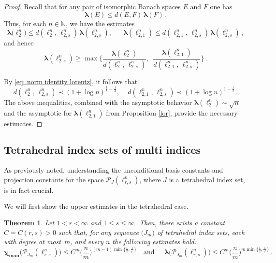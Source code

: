 \documentclass[12pt]{amsart}
\numberwithin{subsection}{section}
\newtheorem{theorem}{Theorem}[section]
\theoremstyle{definition}
\theoremstyle{remark}
\DeclareMathOperator{\mon}{mon}
\newcommand{\chimon}{\chi_{\mon}}
\begin{document}
\begin{proof}
Recall that for any pair of isomorphic Banach spaces $E$ and $F$ one has
\[
\boldsymbol{\lambda}(E) \leq d(E, F)\, \boldsymbol{\lambda}(F)\,.
\]
Thus, for each $n\in \mathbb{N}$, we have the estimates
\[
\boldsymbol{\lambda}({\ell_2^n)} \leq d(\ell_2^n,\, \ell_{2, s}^n)\,\boldsymbol{\lambda}(\ell_{2, s}^n), \quad \,\,\,\,
\boldsymbol{\lambda}{(\ell_{2, 1}^n)} \leq d(\ell_{2, 1}^n, \, \ell_{2, s}^n)\, \boldsymbol{\lambda}(\ell_{2, s}^n)\,,
\]
and hence
\[
\boldsymbol{\lambda}(\ell^n_{2,s}) \geq \max \Bigg\{ \frac{\boldsymbol{\lambda}(\ell_2^n)}{d(\ell_2^n,\, \ell_{2, s}^n)},
\,\,\, \frac{\boldsymbol{\lambda}(\ell_{2, 1}^n)}{d(\ell_{2, 1}^n, \, \ell_{2, s}^n)}\Bigg\}\,.
\]


\noindent
By \eqref{eq: norm identity lorentz}, it follows that
\[
d(\ell_2^n,\,\ell_{2, s}^n) \prec (1 + \log n)^{\frac{1}{s}-\frac{1}{2}}, \quad\,
d(\ell_{2, 1}^n,\,\ell_{2, s}^n )\prec (1 + \log n)^{1-\frac{1}{s}}\,.
\]
The above inequalities, combined with the asymptotic behavior $\boldsymbol{\lambda}(\ell_2^n) \sim \sqrt{n}$ and the asymptotic
for $\boldsymbol{\lambda}(\ell_{2,1}^n)$ from Proposition \ref{lor}, provide the necessary estimates.
\end{proof}



\subsection{Tetrahedral index sets of multi indices}


As previously noted, understanding the unconditional basis constants and projection constants for the space $\mathcal{P}_{J}(\ell_{r,s}^n)$,
where $J$ is a tetrahedral index set, is in fact crucial.


We will first show the upper estimates in the tetrahedral case.


\begin{theorem} \label{t-final}
Let $1 < r < \infty$ and $1 \leq s \leq \infty$. Then, there exists a constant $C=C(r, s)>0$ such that, for any sequence $\big(J_m\big)$
of tetrahedral index sets, each with degree at most~$m$, and every $n$ the following estimates hold{\rm:}
\begin{equation*} 
 \boldsymbol{\chimon}\big(\mathcal{P}_{J_m}(\ell_{r,s}^n)\big)  \leq C^m \Big( \frac{n}{m}\Big)^{(m-1)\min\big\{\frac{1}{2},\frac{1}{r'}\big\}}
\,\,\,\, \text{ and } \,\,\,\,\,\,\,
\boldsymbol{\lambda}\big(\mathcal{P}_{J_m}(\ell_{r,s}^n)\big)  \leq C^m \Big( \frac{n}{m}\Big)^{m\min\big\{\frac{1}{2},\frac{1}{r'}\big\}}\,.
\end{equation*}
\end{theorem}
\end{document}
